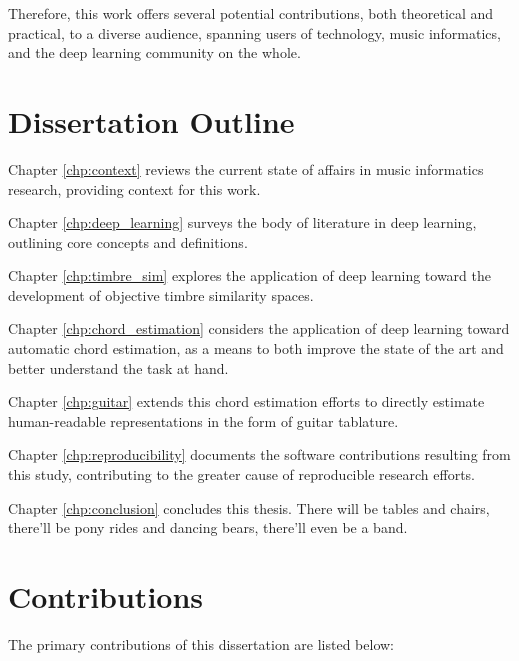 Therefore, this work offers several potential contributions, both theoretical and practical, to a diverse audience, spanning users of technology, music informatics, and the deep learning community on the whole.


\section{Dissertation Outline}
\label{sec:outline}
\begin{description}

\item Chapter \ref{chp:context} reviews the current state of affairs in music informatics research, providing context for this work.

\item Chapter \ref{chp:deep_learning} surveys the body of literature in deep learning, outlining core concepts and definitions.

\item Chapter \ref{chp:timbre_sim} explores the application of deep learning toward the development of objective timbre similarity spaces.

\item Chapter \ref{chp:chord_estimation} considers the application of deep learning toward automatic chord estimation, as a means to both improve the state of the art and better understand the task at hand.

\item Chapter \ref{chp:guitar} extends this chord estimation efforts to directly estimate human-readable representations in the form of guitar tablature.

\item Chapter \ref{chp:reproducibility} documents the software contributions resulting from this study, contributing to the greater cause of reproducible research efforts.

\item Chapter \ref{chp:conclusion} concludes this thesis.
There will be tables and chairs, there'll be pony rides and dancing bears, there'll even be a band.

\end{description}

\section{Contributions}
The primary contributions of this dissertation are listed below:

